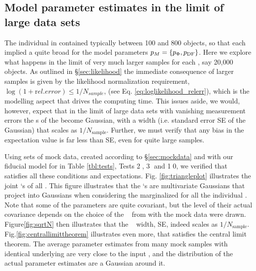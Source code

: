 \subsection{Model parameter estimates in the limit of large data sets} \label{sec:largedata}

The individual \MAP in \citet{bov13} contained typically between 100 and 800 objects, so that each \MAP implied a quite broad \pdf for the model parameters $p_M=\{p_\Phi,p_\text{DF}\}$. Here we explore what happens in the limit of very much larger samples for each \MAP, say 20,000 objects. As outlined in \S\ref{sec:likelihood} the immediate consequence of larger samples is given by the likelihood normalization requirement, $\log(1+{\mathrm rel. error})\le 1/N_{sample}$, (see Eq. \ref{eq:loglikelihood_relerr}), which is the modelling aspect that drives the computing time. This issues aside, we would, however, expect that in the limit of large data sets with vanishing measurement errors the \pdf s of the \pmodel become Gaussian, with a \pdf width (i.e. standard error SE of the Gaussian) that scales as $1/N_\text{sample}$. Further, we must verify that any bias in the \pdf expectation value is far less than SE, even for quite large samples.

Using sets of mock data, created according to \S\ref{sec:mockdata} and with our fiducial model for \pmodel in Table \ref{tbl:tests}, Tests \textcircled{2}, \textcircled{3} and \textcircled{10}, we verified that \RM satisfies all these conditions and expectations. Fig. \ref{fig:triangleplot} illustrates the joint \pdf `s of all \pmodel. This figure illustrates that the \pdf `s are multivariate Gaussians that project into Gaussians when considering the marginalized \pdf for all the individual \pmodel . Note that some of the parameters are quite covariant, but the level of their actual covariance depends on the choice of the \pmodel~ from with the mock data were drawn.  Figure\ref{fig:sqrtN} then illustrates that the \pdf~ width, SE, indeed scales as $1/N_\text{sample}$. Fig.\ref{fig:centrallimittheorem} illustrates even more, that \RM satisfies the central limit theorem. The average parameter estimates from many mock samples with identical underlying \pmodel are very close to the input \pmodel , and the distribution of the actual parameter estimates are a Gaussian around it. 



